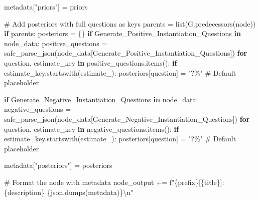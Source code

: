 \documentclass[
  11pt,
  letterpaper,
]{book}
\newenvironment{Shaded}{\begin{snugshade}}{\end{snugshade}}
\newcommand{\BuiltInTok}[1]{\textcolor[rgb]{0.00,0.23,0.31}{#1}}
\newcommand{\CharTok}[1]{\textcolor[rgb]{0.13,0.47,0.30}{#1}}
\newcommand{\CommentTok}[1]{\textcolor[rgb]{0.37,0.37,0.37}{#1}}
\newcommand{\ControlFlowTok}[1]{\textcolor[rgb]{0.00,0.23,0.31}{\textbf{#1}}}
\newcommand{\KeywordTok}[1]{\textcolor[rgb]{0.00,0.23,0.31}{\textbf{#1}}}
\newcommand{\NormalTok}[1]{\textcolor[rgb]{0.00,0.23,0.31}{#1}}
\newcommand{\OperatorTok}[1]{\textcolor[rgb]{0.37,0.37,0.37}{#1}}
\newcommand{\SpecialCharTok}[1]{\textcolor[rgb]{0.37,0.37,0.37}{#1}}
\newcommand{\SpecialStringTok}[1]{\textcolor[rgb]{0.13,0.47,0.30}{#1}}
\newcommand{\StringTok}[1]{\textcolor[rgb]{0.13,0.47,0.30}{#1}}
\begin{document}
\begin{Shaded}
\begin{Highlighting}[]
\NormalTok{      metadata[}\StringTok{"priors"}\NormalTok{] }\OperatorTok{=}\NormalTok{ priors}

      \CommentTok{\# Add posteriors with full questions as keys}
\NormalTok{      parents }\OperatorTok{=} \BuiltInTok{list}\NormalTok{(G.predecessors(node))}
      \ControlFlowTok{if}\NormalTok{ parents:}
\NormalTok{          posteriors }\OperatorTok{=}\NormalTok{ \{\}}
          \ControlFlowTok{if} \StringTok{\textquotesingle{}Generate\_Positive\_Instantiation\_Questions\textquotesingle{}} \KeywordTok{in}\NormalTok{ node\_data:}
\NormalTok{              positive\_questions }\OperatorTok{=}\NormalTok{ safe\_parse\_json(node\_data[}\StringTok{\textquotesingle{}Generate\_Positive\_Instantiation\_Questions\textquotesingle{}}\NormalTok{])}
              \ControlFlowTok{for}\NormalTok{ question, estimate\_key }\KeywordTok{in}\NormalTok{ positive\_questions.items():}
                  \ControlFlowTok{if}\NormalTok{ estimate\_key.startswith(}\StringTok{\textquotesingle{}estimate\_\textquotesingle{}}\NormalTok{):}
\NormalTok{                      posteriors[question] }\OperatorTok{=} \StringTok{"?\%"}  \CommentTok{\# Default placeholder}

          \ControlFlowTok{if} \StringTok{\textquotesingle{}Generate\_Negative\_Instantiation\_Questions\textquotesingle{}} \KeywordTok{in}\NormalTok{ node\_data:}
\NormalTok{              negative\_questions }\OperatorTok{=}\NormalTok{ safe\_parse\_json(node\_data[}\StringTok{\textquotesingle{}Generate\_Negative\_Instantiation\_Questions\textquotesingle{}}\NormalTok{])}
              \ControlFlowTok{for}\NormalTok{ question, estimate\_key }\KeywordTok{in}\NormalTok{ negative\_questions.items():}
                  \ControlFlowTok{if}\NormalTok{ estimate\_key.startswith(}\StringTok{\textquotesingle{}estimate\_\textquotesingle{}}\NormalTok{):}
\NormalTok{                      posteriors[question] }\OperatorTok{=} \StringTok{"?\%"}  \CommentTok{\# Default placeholder}

\NormalTok{          metadata[}\StringTok{"posteriors"}\NormalTok{] }\OperatorTok{=}\NormalTok{ posteriors}

      \CommentTok{\# Format the node with metadata}
\NormalTok{      node\_output }\OperatorTok{+=} \SpecialStringTok{f"}\SpecialCharTok{\{}\NormalTok{prefix}\SpecialCharTok{\}}\SpecialStringTok{[}\SpecialCharTok{\{}\NormalTok{title}\SpecialCharTok{\}}\SpecialStringTok{]: }\SpecialCharTok{\{}\NormalTok{description}\SpecialCharTok{\}}\SpecialStringTok{ }\SpecialCharTok{\{}\NormalTok{json}\SpecialCharTok{.}\NormalTok{dumps(metadata)}\SpecialCharTok{\}}\CharTok{\textbackslash{}n}\SpecialStringTok{"}


\end{Highlighting}
\end{Shaded}
\end{document}
